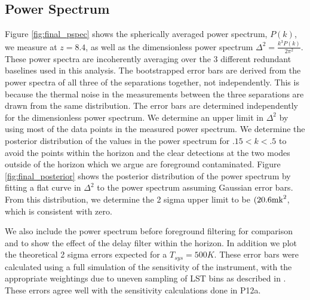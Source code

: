 \documentclass[twocolumn,numberedappendix]{emulateapj} \shorttitle{PSA64}
\begin{document}
\subsection{Power Spectrum}
Figure \ref{fig:final_pspec} shows the spherically averaged power spectrum,
$P(k)$, we measure at $z=8.4$, as well as the dimensionless power spectrum
$\Delta^{2} = \frac{k^{3}P(k)}{2\pi^{2}}$. These power spectra are incoherently
averaging over the 3 different redundant baselines used in this analysis. The
bootstrapped error bars are derived from the power spectra of all three of the
separations together, not independently. This is because the thermal noise in
the measurements between the three separations are drawn from the same
distribution. The error bars are determined independently for the dimensionless
power spectrum. We determine an upper limit in $\Delta^{2}$ by using most of the
data points in the measured power spectrum. We determine the posterior
distribution of the values in the power spectrum for $.15<k<.5$ to avoid the
points within the horizon and the clear detections at the two modes outside of
the horizon which we argue are foreground contaminated. Figure
\ref{fig:final_posterior} shows the posterior distribution of the power spectrum
by fitting a flat curve in $\Delta^{2}$ to the power spectrum assuming
Gaussian error bars. From this distribution, we determine the 2 sigma upper
limit to be $(20.6 \rm{mk}^{2}$, which is consistent with zero.

We also include the power spectrum before foreground filtering for comparison
and to show the effect of the delay filter within the horizon. In addition we
plot the theoretical 2 sigma errors expected for a $T_{sys} = 500 K$. These
error bars were calculated using a full simulation of the sensitivity of the
instrument, with the appropriate weightings due to uneven sampling of LST bins
as described in \cite{pober_et_al2014}. These errors agree well with the
sensitivity calculations done in P12a.
\end{document}
